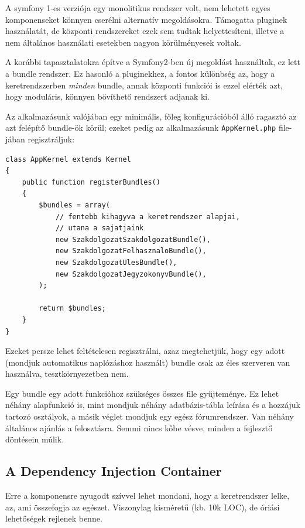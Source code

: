 \documentclass[a4paper,12pt,oneside]{report}
\begin{document}
A symfony 1-es verziója egy monolitikus rendszer volt, nem lehetett egyes komponenseket könnyen cserélni alternatív megoldásokra. Támogatta pluginek használatát, de központi rendszereket ezek sem tudtak helyettesíteni, illetve a nem általános használati esetekben nagyon körülményesek voltak.

A korábbi tapasztalatokra építve a Symfony2-ben új megoldást használtak, ez lett a bundle rendszer\cite{website:symfony2_bundle}. Ez hasonló a pluginekhez, a fontos különbség az, hogy a keretrendszerben \emph{minden} bundle, annak központi funkciói is \textendash{} ezzel elérték azt, hogy moduláris, könnyen bővíthető rendszert adjanak ki.

Az alkalmazásunk valójában egy minimális, főleg konfigurációból álló ragasztó az azt felépítő bundle-ök körül; ezeket pedig az alkalmazásunk \texttt{AppKernel.php} file-jában regisztráljuk:

\begin{lstlisting}
class AppKernel extends Kernel
{
    public function registerBundles()
    {
        $bundles = array(
            // fentebb kihagyva a keretrendszer alapjai,
            // utana a sajatjaink
            new SzakdolgozatSzakdolgozatBundle(),
            new SzakdolgozatFelhasznaloBundle(),
            new SzakdolgozatUlesBundle(),
            new SzakdolgozatJegyzokonyvBundle(),
        );

        return $bundles;
    }
}
\end{lstlisting}

Ezeket persze lehet feltételesen regisztrálni, azaz megtehetjük, hogy egy adott (mondjuk automatikus naplózáshoz használt) bundle csak az éles szerveren van használva, tesztkörnyezetben nem.

Egy bundle egy adott funkcióhoz szükséges összes file gyűjteménye. Ez lehet néhány alapfunkció is, mint mondjuk néhány adatbázis-tábla leírása és a hozzájuk tartozó osztályok, a másik véglet mondjuk egy egész fórumrendszer. Van néhány általános ajánlás a felosztásra. Semmi nincs kőbe vésve, minden a fejlesztő döntésein múlik.

\subsection*{A Dependency Injection Container}

Erre a komponensre nyugodt szívvel lehet mondani, hogy a keretrendszer lelke, az, ami összefogja az egészet. Viszonylag kisméretű (kb. 10k LOC), de óriási lehetőségek rejlenek benne.
\end{document}
